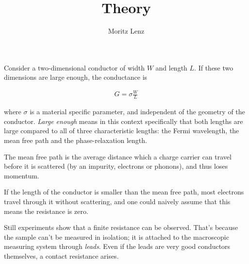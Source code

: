 \documentclass[11pt]{article}
\author{Moritz Lenz}
\title{Theory}
\begin{document}
\maketitle

Consider a two-dimensional conductor of width $W$ and length $L$. If these two
dimensions  are large enough, the conductance is

\begin{align}
    G = \sigma \frac{W}{L}
\end{align}

where $\sigma$ is a material specific parameter, and independent of the
geometry of the conductor. \emph{Large enough} means in this context
specifically that both lengths are large compared to all of three
characteristic lengths: the Fermi wavelength, the mean free path and the
phase-relaxation length.

The mean free path is the average distance which a charge carrier can travel
before it is scattered (by an impurity, electrons or phonons), and thus loses
momentum.

If the length of the conductor is smaller than the mean free path, most
electrons travel through it without scattering, and one could naively assume
that this means the resistance is zero.

Still experiments show that a finite resistance can be observed. That's
because the sample can't be measured in isolation; it is attached to the
macroscopic measuring system through \emph{leads}. Even if the leads are very
good conductors themselves, a contact resistance arises.
\end{document}
